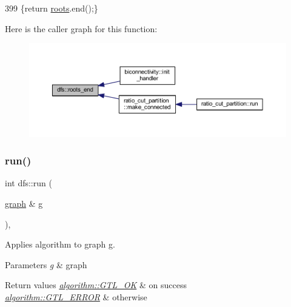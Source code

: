 \begin{DoxyCode}
399     \{\textcolor{keywordflow}{return} \mbox{\hyperlink{classdfs_a0bbd5cb8df26c891b74dadd84b46a06b}{roots}}.end();\}
\end{DoxyCode}
Here is the caller graph for this function\+:
\nopagebreak
\begin{figure}[H]
\begin{center}
\leavevmode
\includegraphics[width=350pt]{classdfs_ae1a61d8c2d8d99059cab410f766ec73f_icgraph}
\end{center}
\end{figure}
\mbox{\label{classdfs_af0863b8974d5fd58cd0375c78ed8163b}} 
\subsubsection{\texorpdfstring{run()}{run()}}
{\footnotesize\ttfamily int dfs\+::run (\begin{DoxyParamCaption}\item[{\mbox{\hyperlink{classgraph}{graph}} \&}]{g }\end{DoxyParamCaption})\hspace{0.3cm}{\ttfamily [virtual]}, {\ttfamily [inherited]}}



Applies algorithm to graph g. 


\begin{DoxyParams}{Parameters}
{\em g} & graph \\
\hline
\end{DoxyParams}

\begin{DoxyRetVals}{Return values}
{\em \mbox{\hyperlink{classalgorithm_af1a0078e153aa99c24f9bdf0d97f6710a5114c20e4a96a76b5de9f28bf15e282b}{algorithm\+::\+G\+T\+L\+\_\+\+OK}}} & on success \\
\hline
{\em \mbox{\hyperlink{classalgorithm_af1a0078e153aa99c24f9bdf0d97f6710a6fcf574690bbd6cf710837a169510dd7}{algorithm\+::\+G\+T\+L\+\_\+\+E\+R\+R\+OR}}} & otherwise \\
\hline
\end{DoxyRetVals}


